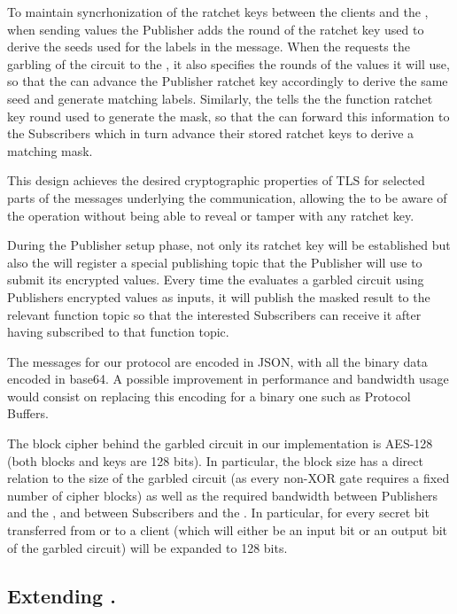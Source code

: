 To maintain syncrhonization of the ratchet keys between the clients and the
\garbler, when sending values the Publisher adds the round of the ratchet key
used to derive the seeds used for the labels in the message.  When the \broker
requests the garbling of the circuit to the \garbler, it also specifies the
rounds of the values it will use, so that the \garbler can advance the
Publisher ratchet key accordingly to derive the same seed and generate matching
labels.  Similarly, the \garbler tells the \broker the function ratchet key
round used to generate the mask, so that the \broker can forward this
information to the Subscribers which in turn advance their stored ratchet keys
to derive a matching mask.

This design achieves the desired cryptographic properties of TLS for selected
parts of the messages underlying the \MQTT{} communication, allowing the \broker
to be aware of the operation without being able to reveal or tamper with any
ratchet key.

During the Publisher setup phase, not only its ratchet key will be established
but also the \broker will register a special publishing topic that the Publisher
will use to submit its encrypted values.  Every time the \broker evaluates a
garbled circuit using Publishers encrypted values as inputs, it will publish
the masked result to the relevant function topic so that the interested
Subscribers can receive it after having subscribed to that function topic.

The \MQTT{} messages for our protocol are encoded in JSON, with all the binary
data encoded in base64.  A possible improvement in performance and bandwidth
usage would consist on replacing this encoding for a binary one such as
Protocol Buffers.

The block cipher behind the garbled circuit in our implementation is AES-128
(both blocks and keys are 128 bits).  In particular, the block size has a
direct relation to the size of the garbled circuit (as every non-XOR gate
requires a fixed number of cipher blocks) as well as the required bandwidth
between Publishers and the \broker, and between Subscribers and the \broker.  In
particular, for every secret bit transferred from or to a client (which will
either be an input bit or an output bit of the garbled circuit) will be
expanded to 128 bits.

\subsection{Extending \libgarble.}

